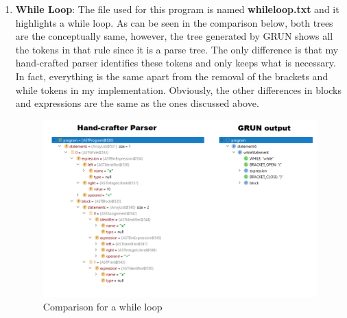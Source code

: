 \documentclass{article}
\begin{document}
\begin{enumerate}
					\item \textbf{While Loop}: The file used for this program is named \textbf{whileloop.txt} and it highlights a while loop. As can be seen in the comparison below, both trees are the conceptually same, however, the tree generated by GRUN shows all the tokens in that rule since it is a parse tree. The only difference is that my hand-crafted parser identifies these tokens and only keeps what is necessary.  In fact, everything is the same apart from the removal of the brackets and while tokens in my implementation. Obviously, the other differences in blocks and expressions are the same as the ones discussed above.
						\begin{figure}[H]
					\centering
			 			\includegraphics[width=\textwidth]{comparewhile.png}
			  			\caption{Comparison for a while loop}
			  			\label{fig:comparewhile}
					\end{figure}
					

\end{enumerate}
\end{document}
